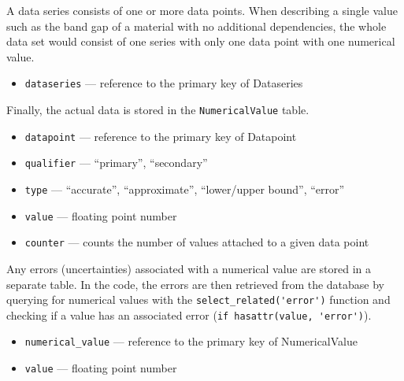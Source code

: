 \documentclass{article}
\begin{document}
A data series consists of one or more data points. When describing a single value such as the band gap of a material with no additional dependencies, the whole data set would consist of one series with only one data point with one numerical value.
\begin{tcolorbox}[colback=green!5,colframe=green!40!black,title=Datapoint(Base)]
  \begin{itemize}
  \item \texttt{dataseries} --- reference to the primary key of Dataseries
  \end{itemize}
\end{tcolorbox}

Finally, the actual data is stored in the \texttt{NumericalValue} table.
\begin{tcolorbox}[colback=green!5,colframe=green!40!black,title=NumericalValue(Base)]
  \begin{itemize}
  \item \texttt{datapoint} --- reference to the primary key of Datapoint
  \item \texttt{qualifier} --- ``primary'', ``secondary''
  \item \texttt{type} --- ``accurate'', ``approximate'', ``lower/upper bound'', ``error''
  \item \texttt{value} --- floating point number
  \item \texttt{counter} --- counts the number of values attached to a given data point
  \end{itemize}
\end{tcolorbox}

Any errors (uncertainties) associated with a numerical value are stored in a separate table. In the code, the errors are then retrieved from the database by querying for numerical values with the \verb+select_related('error')+ function and checking if a value has an associated error (\verb+if hasattr(value, 'error')+).
\begin{tcolorbox}[colback=green!5,colframe=green!40!black,title=Error(Base)]
  \begin{itemize}
  \item \texttt{numerical\_value} --- reference to the primary key of NumericalValue
  \item \texttt{value} --- floating point number
  \end{itemize}
\end{tcolorbox}
\end{document}
